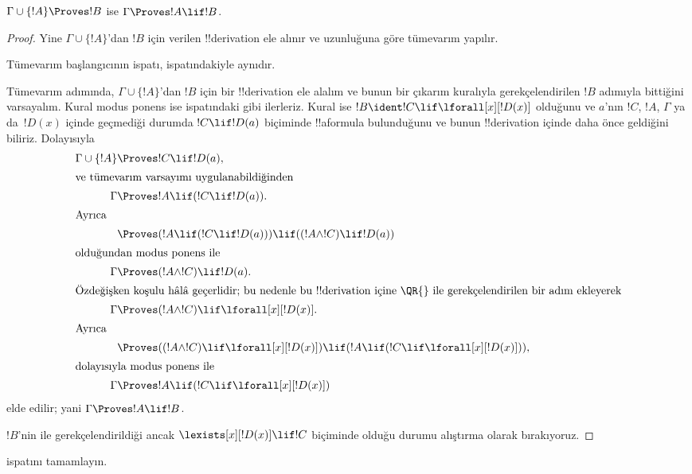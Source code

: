 



\begin{thm}
 $\Gamma \cup \{!A\} \Proves !B$ ise
$\Gamma \Proves !A \lif !B$.
\end{thm}

\begin{proof}
Yine $\Gamma \cup \{!A\}$'dan $!B$ için verilen !!{derivation} ele alınır ve
uzunluğuna göre tümevarım yapılır.

Tümevarım başlangıcının ispatı,  ispatındakiyle
aynıdır.

Tümevarım adımında, $\Gamma \cup \{!A\}$'dan $!B$ için bir !!{derivation}
ele alalım ve bunun bir çıkarım kuralıyla gerekçelendirilen $!B$ adımıyla
bittiğini varsayalım. Kural
modus ponens ise  ispatındaki gibi ilerleriz.
Kural \QR{} ise $!B \ident !C \lif \lforall[x][!D(x)]$ olduğunu ve
$a$'nın $!C$, $!A$, $\Gamma$ ya da~$!D(x)$ içinde geçmediği durumda
$!C \lif !D(a)$ biçiminde !!a{formula} bulunduğunu ve bunun !!{derivation}
içinde daha önce geldiğini biliriz. Dolayısıyla
\begin{align*}
  \Gamma \cup \{!A\} & \Proves !C \lif !D(a),\\
  \intertext{ve tümevarım varsayımı uygulanabildiğinden}
    \Gamma & \Proves !A \lif (!C \lif !D(a)).\\
  \intertext{Ayrıca}
  & \Proves (!A \lif (!C \lif !D(a))) \lif ((!A \land !C) \lif !D(a))\\
  \intertext{olduğundan modus ponens ile}
  \Gamma & \Proves (!A \land !C) \lif !D(a).\\
  \intertext{Özdeğişken koşulu hâlâ geçerlidir; bu nedenle bu !!{derivation} içine \QR{} ile gerekçelendirilen bir adım ekleyerek}
    \Gamma & \Proves (!A \land !C) \lif \lforall[x][!D(x)].\\
  \intertext{Ayrıca}
    & \Proves ((!A \land !C) \lif \lforall[x][!D(x)]) \lif
    (!A \lif (!C \lif \lforall[x][!D(x)])),\\
  \intertext{dolayısıyla modus ponens ile}
    \Gamma & \Proves !A \lif (!C \lif \lforall[x][!D(x)])
\end{align*}
elde edilir; yani $\Gamma \Proves !A \lif !B$.

$!B$'nin \QR{} ile gerekçelendirildiği ancak
$\lexists[x][!D(x)] \lif !C$ biçiminde olduğu durumu alıştırma olarak
bırakıyoruz.
\end{proof}

\begin{prob}
   ispatını tamamlayın.
\end{prob}

